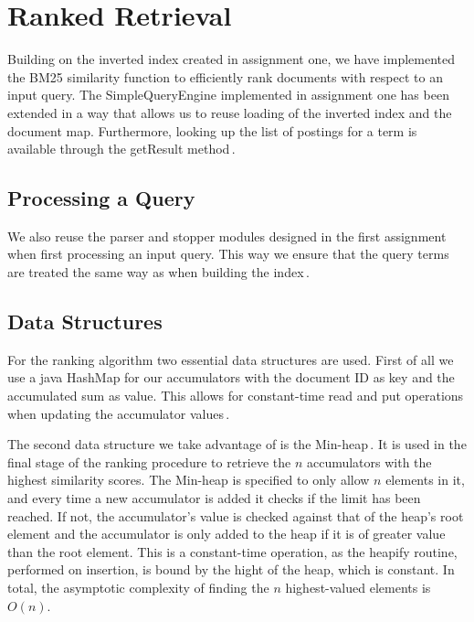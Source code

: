 
\section{Ranked Retrieval}
Building on the inverted index created in assignment one, we have implemented the BM25 similarity function to efficiently rank documents with respect to an input query. The SimpleQueryEngine implemented in assignment one has been extended in a way that allows us to reuse loading of the inverted index and the document map. Furthermore, looking up the list of postings for a term is available through the getResult method\,\cite{dahlsmith13}.

\subsection{Processing a Query}
We also reuse the parser and stopper modules designed in the first assignment when first processing an input query. This way we ensure that the query terms are treated the same way as when building the index\,\cite{dahlsmith13}.


\subsection{Data Structures}
For the ranking algorithm two essential data structures are used. First of all we use a java HashMap for our accumulators with the document ID as key and the accumulated sum as value. This allows for constant-time read and put operations when updating the accumulator values\,\cite{hashmap}.

The second data structure we take advantage of is the Min-heap\,\cite{wolfram13}. It is used in the final stage of the ranking procedure to retrieve the $n$ accumulators with the highest similarity scores. The Min-heap is specified to only allow $n$ elements in it, and every time a new accumulator is added it checks if the limit has been reached. If not, the accumulator's value is checked against that of the heap's root element and the accumulator is only added to the heap if it is of greater value than the root element. This is a constant-time operation, as the heapify routine, performed on insertion, is bound by the hight of the heap, which is constant. In total, the asymptotic complexity of finding the $n$ highest-valued elements is $O(n)$.
